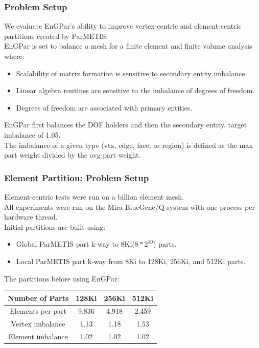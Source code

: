 \documentclass{beamer}
\begin{document}
\begin{frame}
  \frametitle{Problem Setup}
  We evaluate EnGPar's ability to improve vertex-centric
  and element-centric partitions created by ParMETIS.\\
  \medskip
  EnGPar is set to balance a mesh for a finite element and finite volume analysis where:
  \begin{itemize}
    \item Scalability of matrix formation is sensitive to secondary entity imbalance.
    \item Linear algebra routines are sensitive to the imbalance of degrees of freedom.
    \item Degrees of freedom are associated with primary entities.
  \end{itemize}
  \bigskip
  EnGPar first balances the DOF holders and then the secondary entity.
  target imbalance of 1.05. \\
  The imbalance of a given type (vtx, edge, face, or region) is defined as the 
  max part weight divided by the avg part weight.
\end{frame}

\begin{frame}
  \frametitle{Element Partition: Problem Setup}
  \medskip
  Element-centric tests were run on a billion element mesh. \\
  All experiments were run on the Mira BlueGene/Q system with one process per
  hardware thread. \\
  \smallskip
  Initial partitions are built using:
  \begin{itemize}
  \item Global ParMETIS part k-way to 8Ki($8*2^{10}$) parts.
  \item Local ParMETIS part k-way from 8Ki to 128Ki, 256Ki, and 512Ki parts.
  \end{itemize}
  The partitions before using EnGPar:\\
  \begin{table}[!h]
    \centering
    \begin{tabular}{||c|c|c|c||}
      \hline
      Number of Parts &128Ki&256Ki&512Ki \\
      \hline
      Elements per part & 9,836 & 4,918&2,459  \\
      \hline
      Vertex imbalance & 1.13 & 1.18 & 1.53 \\
      \hline
      Element imbalance & 1.02& 1.02& 1.02\\
      \hline
    \end{tabular}
  \end{table}
\end{frame}
\end{document}
